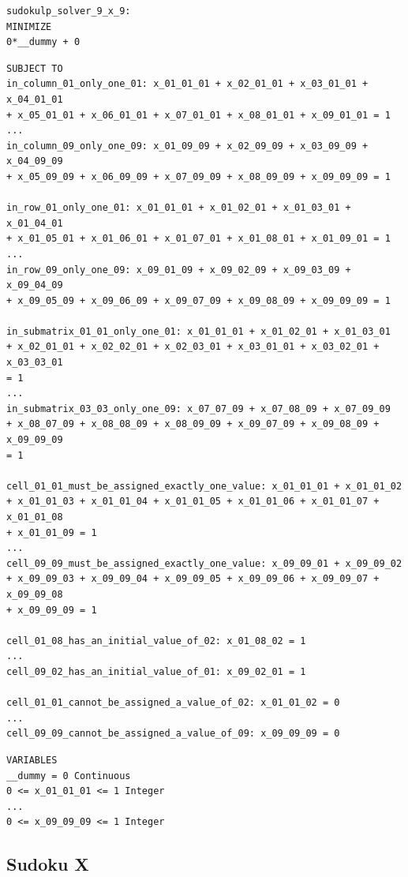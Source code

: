\documentclass[12pt]{article}
\begin{document}
\begin{lstlisting}[caption={TODO}]
sudokulp_solver_9_x_9:
MINIMIZE
0*__dummy + 0
\end{lstlisting}

\begin{lstlisting}[caption={TODO}]
SUBJECT TO
in_column_01_only_one_01: x_01_01_01 + x_02_01_01 + x_03_01_01 + x_04_01_01
+ x_05_01_01 + x_06_01_01 + x_07_01_01 + x_08_01_01 + x_09_01_01 = 1
...
in_column_09_only_one_09: x_01_09_09 + x_02_09_09 + x_03_09_09 + x_04_09_09
+ x_05_09_09 + x_06_09_09 + x_07_09_09 + x_08_09_09 + x_09_09_09 = 1

in_row_01_only_one_01: x_01_01_01 + x_01_02_01 + x_01_03_01 + x_01_04_01
+ x_01_05_01 + x_01_06_01 + x_01_07_01 + x_01_08_01 + x_01_09_01 = 1
...
in_row_09_only_one_09: x_09_01_09 + x_09_02_09 + x_09_03_09 + x_09_04_09
+ x_09_05_09 + x_09_06_09 + x_09_07_09 + x_09_08_09 + x_09_09_09 = 1

in_submatrix_01_01_only_one_01: x_01_01_01 + x_01_02_01 + x_01_03_01
+ x_02_01_01 + x_02_02_01 + x_02_03_01 + x_03_01_01 + x_03_02_01 + x_03_03_01
= 1
...
in_submatrix_03_03_only_one_09: x_07_07_09 + x_07_08_09 + x_07_09_09
+ x_08_07_09 + x_08_08_09 + x_08_09_09 + x_09_07_09 + x_09_08_09 + x_09_09_09
= 1

cell_01_01_must_be_assigned_exactly_one_value: x_01_01_01 + x_01_01_02
+ x_01_01_03 + x_01_01_04 + x_01_01_05 + x_01_01_06 + x_01_01_07 + x_01_01_08
+ x_01_01_09 = 1
...
cell_09_09_must_be_assigned_exactly_one_value: x_09_09_01 + x_09_09_02
+ x_09_09_03 + x_09_09_04 + x_09_09_05 + x_09_09_06 + x_09_09_07 + x_09_09_08
+ x_09_09_09 = 1

cell_01_08_has_an_initial_value_of_02: x_01_08_02 = 1
...
cell_09_02_has_an_initial_value_of_01: x_09_02_01 = 1

cell_01_01_cannot_be_assigned_a_value_of_02: x_01_01_02 = 0
...
cell_09_09_cannot_be_assigned_a_value_of_09: x_09_09_09 = 0
\end{lstlisting}

\begin{lstlisting}[caption={TODO}]
VARIABLES
__dummy = 0 Continuous
0 <= x_01_01_01 <= 1 Integer
...
0 <= x_09_09_09 <= 1 Integer
\end{lstlisting}

\pagebreak

\subsection{Sudoku X}
\end{document}
